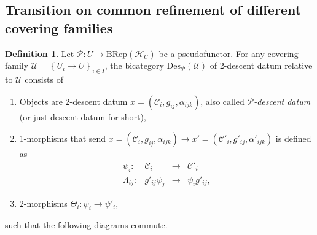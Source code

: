 \documentclass[reqno]{amsart}
\theoremstyle{definition}
\newtheorem{definition}[formula]{Definition}
\theoremstyle{remark}
\begin{document}
\subsection{Transition on common refinement of different covering families}
\begin{definition}
    Let $\mathscr{P}:U\longmapsto \text{BRep}(\mathscr{H}_U)$ be a pseudofunctor. For any covering family $\mathcal{U}=\left\{U_i \longrightarrow U\right\}_{i\in I}$, the bicategory $\text{Des}_\mathscr{P}(\mathcal{U})$ of 2-descent datum relative to $\mathcal{U}$ consists of
    \begin{enumerate}
        \item Objects are 2-descent datum $x=\left(\mathcal{C}_i,g_{ij},\alpha_{ijk}\right)$, also called \textit{$\mathscr{P}$-descent datum} (or just descent datum for short),
        \item 1-morphisms that send $x=\left(\mathcal{C}_i,g_{ij},\alpha_{ijk}\right) \longrightarrow x'=\left(\mathcal{C}'_i,g'_{ij},\alpha'_{ijk}\right)$ is defined as
        \begin{equation}
            \begin{array}{rccc}
\psi_i: & \mathcal{C}_i & \longrightarrow & \mathcal{C}'_i \\
 \Lambda_{ij}:  &g'_{ij} \psi_j& \longrightarrow  & \psi_i g'_{ij},
\end{array}
        \end{equation}
        \item 2-morphisms $\Theta_i: \psi_i \longrightarrow \psi'_i$,
    \end{enumerate}
    such that the following diagrams commute.
\end{definition}
\end{document}
